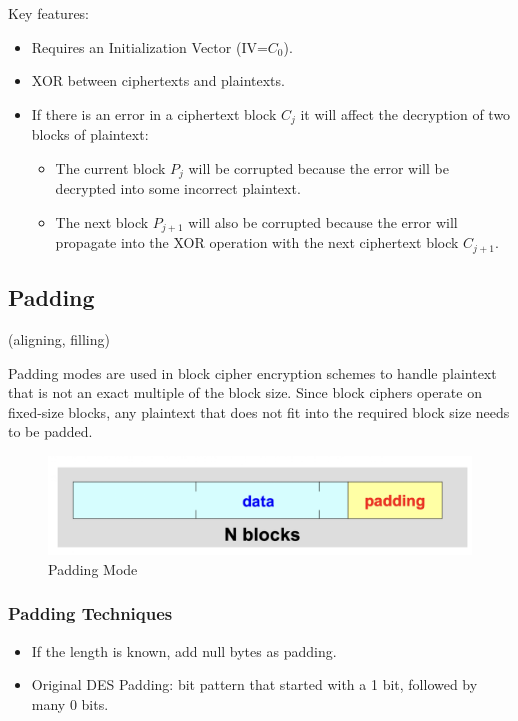 Key features:
\begin{itemize}
    \item Requires an Initialization Vector (IV=$C_0$).
    \item XOR between ciphertexts and plaintexts.
    \item If there is an error in a ciphertext block $C_j$ it will affect the decryption of two blocks of plaintext:
    \begin{itemize}
        \item The current block $P_j$ will be corrupted because the error will be decrypted into some incorrect plaintext. 
        \item The next block  $P_{j+1}$  will also be corrupted because the error will propagate into the XOR operation with the next ciphertext block  $C_{j+1}$.
    \end{itemize} 
\end{itemize}

\subsection{Padding}
\begin{center}
    (aligning, filling)
\end{center}

Padding modes are used in block cipher encryption schemes to handle plaintext that is not an exact multiple of the block size. Since block ciphers operate on fixed-size blocks, any plaintext that does not fit into the required block size needs to be padded.
\begin{figure}[H]
    \includegraphics[width=\linewidth]{Images/Cryptography/padding.png}
    \caption{Padding Mode}
    
\end{figure}

\subsubsection{Padding Techniques}
\begin{itemize}
    \item If the length is known, add null bytes as padding.
    \item Original DES Padding: bit pattern that started with a 1 bit, followed by many 0 bits.
\end{itemize}

